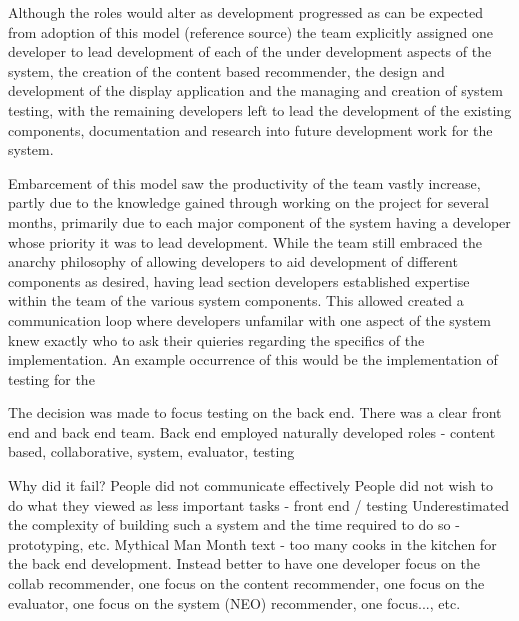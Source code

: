\documentclass{l3proj}
\begin{document}
Although the roles would alter as development progressed as can be expected from adoption of this model (reference source) the team explicitly assigned one developer to lead development of each of the under development aspects of the system, the creation of the content based recommender, the design and development of the display application and the managing and creation of system testing, with the remaining developers left to lead the development of the existing components, documentation and research into future development work for the system. 


Embarcement of this model saw the productivity of the team vastly increase, partly due to the knowledge gained through working on the project for several months, primarily due to each major component of the system having a developer whose priority it was to lead development. 
While the team still embraced the anarchy philosophy of allowing developers to aid development of different components as desired, having lead section developers established expertise within the team of the various system components. This allowed created a communication loop where developers unfamilar with one aspect of the system knew exactly who to ask their quieries regarding the specifics of the implementation. An example occurrence of this would be the implementation of testing for the %


The decision was made to focus testing on the back end.
There was a clear front end and back end team.
Back end employed naturally developed roles - content based, collaborative, system, evaluator, testing  

Why did it fail?
People did not communicate effectively
People did not wish to do what they viewed as less important tasks - front end / testing
Underestimated the complexity of building such a system and the time required to do so - prototyping, etc.
Mythical Man Month text - too many cooks in the kitchen for the back end development. Instead better to have one developer focus on the collab recommender, one focus on the content recommender, one focus on the evaluator, one focus on the system (NEO) recommender, one focus..., etc.
\end{document}
